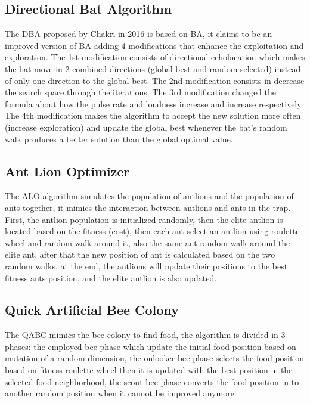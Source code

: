 \documentclass[12pt]{article}
\begin{document}
\subsection{Directional Bat Algorithm}
The DBA proposed by Chakri in 2016 is based on BA, it claims to be an improved version of BA adding 4 modifications that enhance the exploitation and exploration. The 1st modification consists of directional echolocation which makes the bat move in 2 combined directions (global best and random selected) instead of only one direction to the global best. The 2nd modification consists in decrease the search space through the iterations. The 3rd modification changed the formula about how the pulse rate and loudness increase and increase respectively. The 4th modification makes the algorithm to accept the new solution more often (increase exploration) and update the global best whenever the bat's random walk produces a better solution than the global optimal value.

\subsection{Ant Lion Optimizer}

The ALO algorithm simulates the population of antlions and the population of ants together, it mimics the interaction between antlions and ants in the trap. First, the antlion population is initialized randomly, then the elite antlion is located based on the fitness (cost), then each ant select an antlion using roulette wheel and random walk around it, also the same ant random walk around the elite ant, after that the new position of ant is calculated based on the two random walks, at the end, the antlions will update their positions to the best fitness ants position, and the elite antlion is also updated. 

\subsection{Quick Artificial Bee Colony}
The QABC mimics the bee colony to find food, the algorithm is divided in 3 phases: the employed bee phase which update the initial food position based on mutation of a random dimension, the onlooker bee phase selects the food position based on fitness roulette wheel then it is updated with the best position in the selected food neighborhood, the scout bee phase converts the food position in to another random position when it cannot be improved anymore.

     
\end{document}
